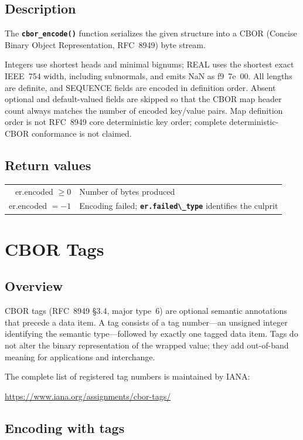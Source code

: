 \documentclass[english,oneside,12pt]{book}
\newcommand{\apisection}[2]{\clearpage\section{\label{#1}#2}}
\newcommand{\code}[1]{\texttt{\textbf{\lstinline{#1}}}}
\begin{document}
\subsection*{Description}

The \code{cbor_encode()} function serializes the given structure into a
CBOR (Concise Binary Object Representation, RFC~8949) byte stream.

Integers use shortest heads and minimal bignums; REAL uses the shortest exact
IEEE~754 width, including subnormals, and emits NaN as f9~7e~00. All lengths
are definite, and SEQUENCE fields are
encoded in definition order. Absent optional and default-valued fields are
skipped so that the CBOR map header count always matches the number of encoded
key/value pairs. Map definition order is not RFC~8949 core deterministic
key order; complete deterministic-CBOR conformance is not claimed.

\subsection*{Return values}

\begin{tabular}[h!]{rl}
er.encoded $\geq 0$ & Number of bytes produced \\
er.encoded $= -1$ & Encoding failed; \code{er.failed\_type} identifies the culprit
\end{tabular}

\apisection{sec:cbor_tags}{CBOR Tags}

\subsection*{Overview}

CBOR tags (RFC~8949 \S3.4, major type~6) are optional semantic annotations
that precede a data item.  A tag consists of a tag number---an unsigned
integer identifying the semantic type---followed by exactly one tagged
data item.  Tags do not alter the binary representation of the wrapped
value; they add out-of-band meaning for applications and interchange.

The complete list of registered tag numbers is maintained by IANA:
\begin{center}
\url{https://www.iana.org/assignments/cbor-tags/}
\end{center}

\subsection*{Encoding with tags}
\end{document}

